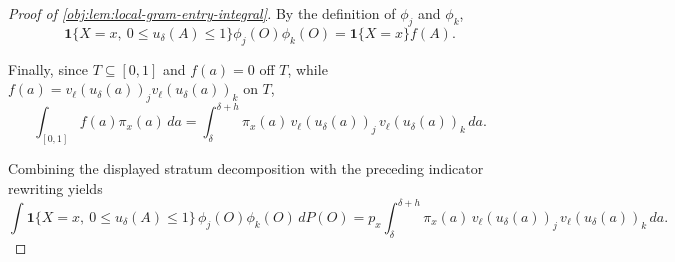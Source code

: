 \begin{proof}[Proof of \cref{obj:lem:local-gram-entry-integral}]
By the definition of \(\phi_j\) and \(\phi_k\),
\[
\mathbf 1\{X=x,\ 0\le u_\delta(A)\le1\}\phi_j(O)\phi_k(O)
=
\mathbf 1\{X=x\}f(A).
\] %

Finally, since \(T\subseteq[0,1]\) and \(f(a)=0\) off \(T\), while
\(f(a)=v_\ell(u_\delta(a))_jv_\ell(u_\delta(a))_k\) on \(T\),
\[
\int_{[0,1]}f(a)\pi_x(a)\,da
=
\int_{\delta}^{\delta+h}
\pi_x(a)\,
v_\ell(u_\delta(a))_j\,
v_\ell(u_\delta(a))_k\,da .
\] %

Combining the displayed stratum decomposition with the preceding indicator rewriting yields
\[
\int \mathbf 1\{X=x,\ 0\le u_\delta(A)\le 1\}\,\phi_j(O)\phi_k(O)\,dP(O)
=
p_x\int_{\delta}^{\delta+h}
\pi_x(a)\,
v_\ell(u_\delta(a))_j\,
v_\ell(u_\delta(a))_k\,da .
\] %
\end{proof}
